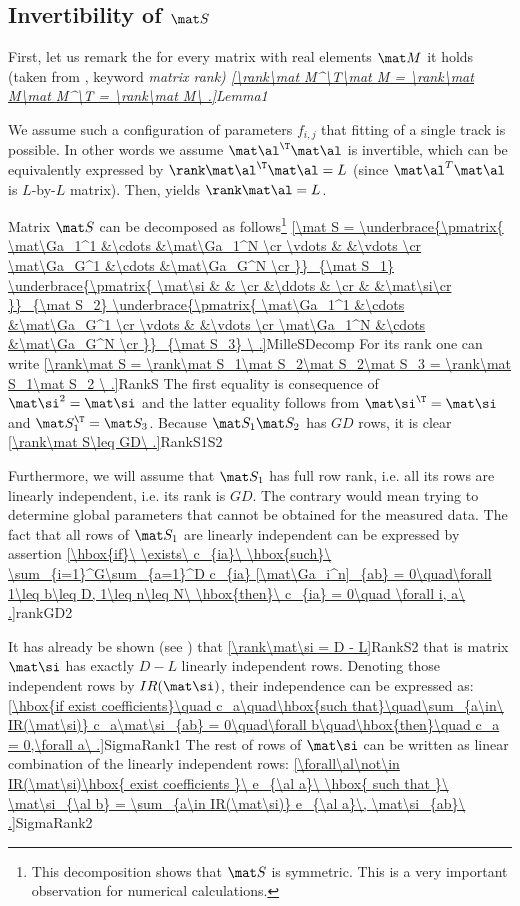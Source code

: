 \subsection{Invertibility of $\mat S$}

First, let us remark the for every matrix with real elements $\mat M$ it holds (taken from , keyword \em{matrix rank})
\eqref{\rank\mat M^\T\mat M = \rank\mat M\mat M^\T = \rank\mat M\ .}{Lemma1}

We assume such a configuration of parameters $f_{i,j}$ that fitting of a single track is possible. In other words we assume $\mat\al^\T\mat\al$ is invertible, which can be equivalently expressed by $\rank \mat\al^\T\mat\al = L$ (since $\mat\al^T\mat\al$ is $L$-by-$L$ matrix). Then,  yields $\rank\mat\al = L$.

Matrix $\mat S$ can be decomposed as follows\footnote{%
This decomposition shows that $\mat S$ is symmetric. This is a very important observation for numerical calculations.
}
\eqref{\mat S = 
\underbrace{\pmatrix{
\mat\Ga_1^1	&\cdots	&\mat\Ga_1^N	\cr
\vdots		&		&\vdots			\cr
\mat\Ga_G^1	&\cdots	&\mat\Ga_G^N	\cr
}}_{\mat S_1}
\underbrace{\pmatrix{
\mat\si	&		&		\cr
		&\ddots	&		\cr
		&		&\mat\si\cr
}}_{\mat S_2}
\underbrace{\pmatrix{
\mat\Ga_1^1	&\cdots	&\mat\Ga_G^1	\cr
\vdots		&		&\vdots			\cr
\mat\Ga_1^N	&\cdots	&\mat\Ga_G^N	\cr
}}_{\mat S_3}
\ .}{MilleSDecomp}
For its rank one can write
\eqref{\rank\mat S = \rank\mat S_1\mat S_2\mat S_2\mat S_3 = \rank\mat S_1\mat S_2 \ .}{RankS}
The first equality is consequence of $\mat\si^2=\mat\si$ and the latter equality follows from $\mat\si^\T = \mat\si$ and $\mat S_1^\T = \mat S_3$. Because $\mat S_1\mat S_2$ has $GD$ rows, it is clear
\eqref{\rank\mat S\leq GD\ .}{RankS1S2}

Furthermore, we will assume that $\mat S_1$ has full row rank, i.e. all its rows are linearly independent, i.e. its rank is $GD$. The contrary would mean trying to determine global parameters that cannot be obtained for the measured data. The fact that all rows of $\mat S_1$ are linearly independent can be expressed by assertion
\eqref{\hbox{if}\ \exists\ c_{ia}\ \hbox{such}\ \sum_{i=1}^G\sum_{a=1}^D c_{ia} [\mat\Ga_i^n]_{ab} = 0\quad\forall 1\leq b\leq D, 1\leq n\leq N\ \hbox{then}\ c_{ia} = 0\quad \forall i, a\ .}{rankGD2}

It has already be shown (see ) that
\eqref{\rank\mat\si = D - L}{RankS2}
that is matrix $\mat\si$ has exactly $D-L$ linearly independent rows. Denoting those independent rows by $IR(\mat\si)$, their independence can be expressed as:
\eqref{\hbox{if exist coefficients}\quad c_a\quad\hbox{such that}\quad\sum_{a\in\ IR(\mat\si)} c_a\mat\si_{ab} = 0\quad\forall b\quad\hbox{then}\quad c_a = 0,\forall a\ .}{SigmaRank1}
The rest of rows of $\mat\si$ can be written as linear combination of the linearly independent rows:
\eqref{\forall\al\not\in IR(\mat\si)\hbox{ exist coefficients }\ e_{\al a}\ \hbox{ such that }\ \mat\si_{\al b} = \sum_{a\in IR(\mat\si)} e_{\al a}\, \mat\si_{ab}\ .}{SigmaRank2}

